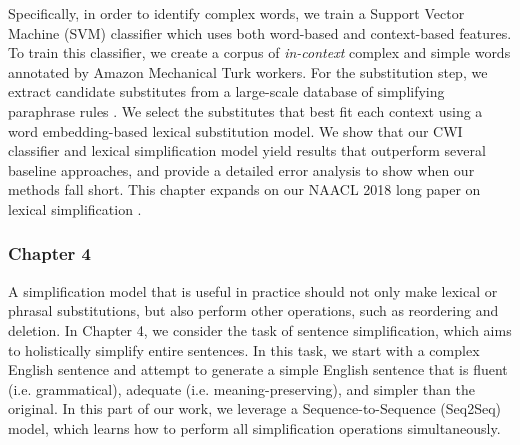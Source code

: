 \documentclass[thesis.tex]{subfiles}
\begin{document}
Specifically, in order to identify complex words, we train a Support Vector Machine (SVM) classifier which uses both word-based and context-based features. To train this classifier, we create a corpus of \textit{in-context} complex and simple words annotated by Amazon Mechanical Turk workers. For the substitution step, we extract candidate substitutes from a large-scale database of simplifying paraphrase rules \citep{pavlick2016simple}. We select the substitutes that best fit each context using a word embedding-based lexical substitution model. We show that our CWI classifier and lexical simplification model yield results that outperform several baseline approaches, and provide a detailed error analysis to show when our methods fall short. This chapter expands on our NAACL 2018 long paper on lexical simplification \citep{kriz2018simplification}.

\subsubsection{Chapter 4}

A simplification model that is useful in practice should not only make lexical or phrasal substitutions, but also perform other operations, such as reordering and deletion. In Chapter 4, we consider the task of sentence simplification, which aims to holistically simplify entire sentences. In this task, we start with a complex English sentence and attempt to generate a simple English sentence that is fluent (i.e. grammatical), adequate (i.e. meaning-preserving), and simpler than the original. In this part of our work, we leverage a Sequence-to-Sequence (Seq2Seq) model, which learns how to perform all simplification operations simultaneously.
\end{document}
